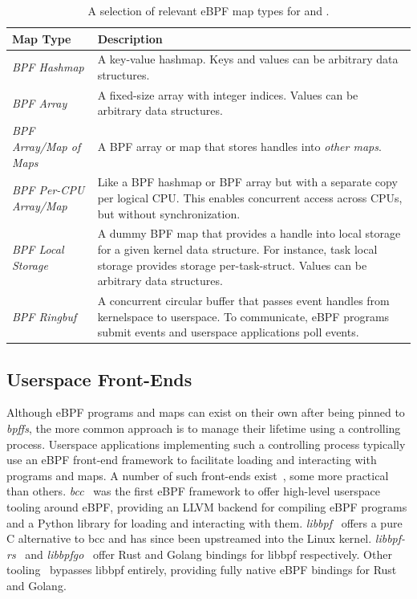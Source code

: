 \begingroup\footnotesize
\begin{longtable}[c]{lp{3.9in}}
\caption{A selection of relevant eBPF map types for \bpfbox{} and \bpfcontain{}.}%
\label{tab:map-types}\\
  \toprule
  Map Type & Description\\
  \midrule
  \textit{BPF Hashmap}           & A key-value hashmap. Keys and values can be arbitrary data structures.\\
  \textit{BPF Array}             & A fixed-size array with integer indices. Values can be arbitrary data structures.\\
  \textit{BPF Array/Map of Maps} & A BPF array or map that stores handles into \textit{other maps}.\\
  \textit{BPF Per-CPU Array/Map} & Like a BPF hashmap or BPF array but with a separate copy per logical CPU\@. This enables concurrent access across CPUs, but without synchronization.\\
  \textit{BPF Local Storage}     & A dummy BPF map that provides a handle into local storage for a given kernel data structure. For instance, task local storage provides storage per-task-struct. Values can be arbitrary data structures.\\
  \textit{BPF Ringbuf}           & A concurrent circular buffer that passes event handles from kernelspace to userspace. To communicate, eBPF programs submit events and userspace applications poll events.\\
  \bottomrule
\end{longtable}
\endgroup

\subsection{Userspace Front-Ends}%
\label{ss:bpf-userspace}

Although eBPF programs and maps can exist on their own after being pinned to
\textit{bpffs}, the more common approach is to manage their lifetime using a controlling
process. Userspace applications implementing such a controlling process typically use an
eBPF front-end framework to facilitate loading and interacting with programs and maps.
A number of such front-ends exist~\cite{gobpf, bcc, libbpf, libbpf-rs, libbpfgo,
cilium-ebpf, redbpf}, some more practical than others.
\textit{bcc}~\cite{bcc} was the first eBPF framework to offer high-level userspace tooling
around eBPF, providing an LLVM backend for compiling eBPF programs and a Python library
for loading and interacting with them. \textit{libbpf}~\cite{libbpf} offers a pure
C alternative to bcc and has since been upstreamed into the Linux kernel.
\textit{libbpf-rs}~\cite{libbpf-rs} and \textit{libbpfgo}~\cite{libbpfgo} offer Rust
and Golang bindings for libbpf respectively. Other tooling~\cite{cilium-ebpf, redbpf}
bypasses libbpf entirely, providing fully native eBPF bindings for Rust and Golang.


